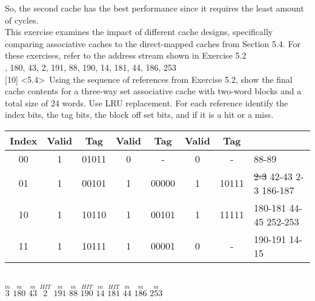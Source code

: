 \documentclass[12pt]{article}
\begin{document}
	\noindent So, the second cache has the best performance since it requires the least amount of cycles.   \vspace{0.5cm} \\
	

	
	
	\noindent {} 
	This exercise examines the impact of different cache designs, specifically
	comparing associative caches to the direct-mapped caches from Section 5.4. For these
	exercises, refer to the address stream shown in Exercise 5.2 \vspace{0.3cm} \\
	
	, 180, 43, 2, 191, 88, 190, 14, 181, 44, 186, 253  \vspace{0.3cm} \\
	
	\noindent {} 
	[10] \textless5.4\textgreater \ Using the sequence of references from Exercise 5.2, show the final
	cache contents for a three-way set associative cache with two-word blocks and a total
	size of 24 words. Use LRU replacement. For each reference identify the index bits, the
	tag bits, the block off set bits, and if it is a hit or a miss. \\
	
	
	\begin{center}
		\begin{tabular}{ |c|c|c|c|c|c|c|l| } 
			\hline
			Index & Valid & Tag & Valid & Tag & Valid & Tag &  \\
			\hline
			00 & 1 & 01011 & 0 & - & 0 & - & 88-89 \\
			\hline
			01 & 1 & 00101 & 1 & 00000 & 1 & 10111 & \sout{2-3} 42-43 2-3 186-187\\
			\hline
			10 & 1 & 10110 & 1 & 00101 & 1 & 11111 & 180-181 44-45 252-253 \\
			\hline
			11 & 1 & 10111 & 1 & 00001 & 0 & - & 190-191 14-15 \\
			\hline
			
		\end{tabular}
		\vspace{0.3cm} \\
		
		$\overset{m}{3}$ $\overset{m}{180}$ $\overset{m}{43}$ $\overset{HIT}{2}$ $\overset{m}{191}$ $\overset{m}{88}$ $\overset{HIT}{190}$ $\overset{m}{14}$ $\overset{HIT}{181}$ $\overset{m}{44}$ $\overset{m}{186}$ $\overset{m}{253}$  \vspace{0.5cm} \\
	\end{center}
	
\end{document}
